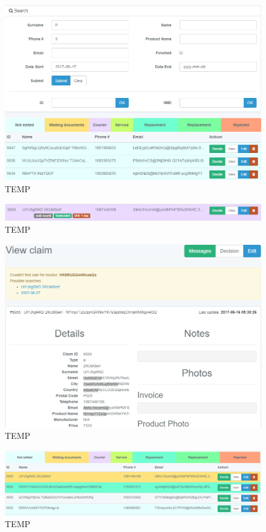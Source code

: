	\begin{figure}
		\includegraphics[width=\linewidth]{../imagini/claims_search.png}
		\caption{TEMP}
		\label{fig:TEMP}
	\end{figure}
	\begin{figure}
		\includegraphics[width=\linewidth]{../imagini/claims_tags.png}
		\caption{TEMP}
		\label{fig:TEMP}
	\end{figure}
	\begin{figure}
		\includegraphics[width=\linewidth]{../imagini/claims_view.png}
		\caption{TEMP}
		\label{fig:TEMP}
	\end{figure}
	\begin{figure}
		\includegraphics[width=\linewidth]{../imagini/color_coding.png}
		\caption{TEMP}
		\label{fig:TEMP}
	\end{figure}
